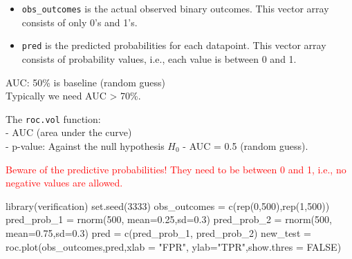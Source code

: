 \documentclass[
]{article}
\newenvironment{Shaded}{\begin{snugshade}}{\end{snugshade}}
\newcommand{\AttributeTok}[1]{\textcolor[rgb]{0.77,0.63,0.00}{#1}}
\newcommand{\ConstantTok}[1]{\textcolor[rgb]{0.00,0.00,0.00}{#1}}
\newcommand{\DecValTok}[1]{\textcolor[rgb]{0.00,0.00,0.81}{#1}}
\newcommand{\FloatTok}[1]{\textcolor[rgb]{0.00,0.00,0.81}{#1}}
\newcommand{\FunctionTok}[1]{\textcolor[rgb]{0.00,0.00,0.00}{#1}}
\newcommand{\NormalTok}[1]{#1}
\newcommand{\OtherTok}[1]{\textcolor[rgb]{0.56,0.35,0.01}{#1}}
\newcommand{\StringTok}[1]{\textcolor[rgb]{0.31,0.60,0.02}{#1}}
\providecommand{\tightlist}{%
  \setlength{\itemsep}{0pt}\setlength{\parskip}{0pt}}
\begin{document}
\begin{itemize}
\tightlist
\item
  \texttt{obs\_outcomes} is the actual observed binary outcomes. This
  vector array consists of only 0's and 1's.
\item
  \texttt{pred} is the predicted probabilities for each datapoint. This
  vector array consists of probability values, i.e., each value is
  between 0 and 1.
\end{itemize}

AUC: 50\% is baseline (random guess)\\
Typically we need AUC \textgreater{} 70\%.

The \texttt{roc.vol} function:\\
- AUC (area under the curve)\\
- p-value: Against the null hypothesis \(H_0\) - AUC = 0.5 (random
guess).

\textcolor{red}{Beware of the predictive probabilities! They need to be between 0 and 1, i.e., no negative values are allowed.}

\begin{Shaded}
\begin{Highlighting}[]
\FunctionTok{library}\NormalTok{(verification)}
\FunctionTok{set.seed}\NormalTok{(}\DecValTok{3333}\NormalTok{)}
\NormalTok{obs\_outcomes }\OtherTok{=} \FunctionTok{c}\NormalTok{(}\FunctionTok{rep}\NormalTok{(}\DecValTok{0}\NormalTok{,}\DecValTok{500}\NormalTok{),}\FunctionTok{rep}\NormalTok{(}\DecValTok{1}\NormalTok{,}\DecValTok{500}\NormalTok{))}
\NormalTok{pred\_prob\_1 }\OtherTok{=} \FunctionTok{rnorm}\NormalTok{(}\DecValTok{500}\NormalTok{, }\AttributeTok{mean=}\FloatTok{0.25}\NormalTok{,}\AttributeTok{sd=}\FloatTok{0.3}\NormalTok{)}
\NormalTok{pred\_prob\_2 }\OtherTok{=} \FunctionTok{rnorm}\NormalTok{(}\DecValTok{500}\NormalTok{, }\AttributeTok{mean=}\FloatTok{0.75}\NormalTok{,}\AttributeTok{sd=}\FloatTok{0.3}\NormalTok{)}
\NormalTok{pred }\OtherTok{=} \FunctionTok{c}\NormalTok{(pred\_prob\_1, pred\_prob\_2)}
\NormalTok{new\_test }\OtherTok{=} \FunctionTok{roc.plot}\NormalTok{(obs\_outcomes,pred,}\AttributeTok{xlab =} \StringTok{"FPR"}\NormalTok{, }\AttributeTok{ylab=}\StringTok{"TPR"}\NormalTok{,}\AttributeTok{show.thres =} \ConstantTok{FALSE}\NormalTok{)}
\end{Highlighting}
\end{Shaded}
\end{document}
